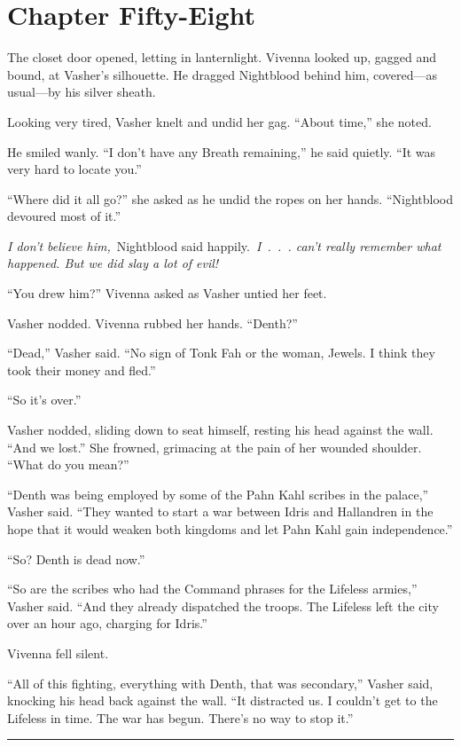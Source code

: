 \section{Chapter Fifty-Eight}

The closet door opened, letting in lanternlight. Vivenna looked up, gagged and bound, at Vasher’s silhouette. He dragged Nightblood behind him, covered—as usual—by his silver sheath.

Looking very tired, Vasher knelt and undid her gag. “About time,” she noted.

He smiled wanly. “I don’t have any Breath remaining,” he said quietly. “It was very hard to locate you.”

“Where did it all go?” she asked as he undid the ropes on her hands. “Nightblood devoured most of it.”

\textit{I don’t believe him,}~Nightblood said happily.~\textit{I~.~.~. can’t really remember what happened. But we did slay a lot of evil!}

“You drew him?” Vivenna asked as Vasher untied her feet.

Vasher nodded. Vivenna rubbed her hands. “Denth?”

“Dead,” Vasher said. “No sign of Tonk Fah or the woman, Jewels. I think they took their money and fled.”

“So it’s over.”

Vasher nodded, sliding down to seat himself, resting his head against the wall. “And we lost.” She frowned, grimacing at the pain of her wounded shoulder. “What do you mean?”

“Denth was being employed by some of the Pahn Kahl scribes in the palace,” Vasher said. “They wanted to start a war between Idris and Hallandren in the hope that it would weaken both kingdoms and let Pahn Kahl gain independence.”

“So? Denth is dead now.”

“So are the scribes who had the Command phrases for the Lifeless armies,” Vasher said. “And they already dispatched the troops. The Lifeless left the city over an hour ago, charging for Idris.”

Vivenna fell silent.

“All of this fighting, everything with Denth, that was secondary,” Vasher said, knocking his head back against the wall. “It distracted us. I couldn’t get to the Lifeless in time. The war has begun. There’s no way to stop it.”

\bigskip \hrule \bigskip

